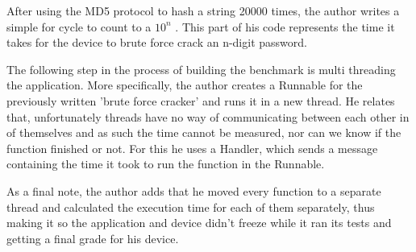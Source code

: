 \documentclass[a4paper,10pt]{report}
\begin{document}
 After using the MD5 protocol to hash a string 20000 times, the author writes a simple for cycle to count to a $ 10^n $ . This part of his code represents the time it takes for the device to brute force crack an n-digit password. 
 
 The following step in the process of building the benchmark is multi threading the application. More specifically, the author creates a Runnable for the previously written 'brute force cracker' and runs it in a new thread. He relates that, unfortunately threads have no way of communicating between each other in of themselves and as such the time cannot be measured, nor can we know if the function finished or not. For this he uses a Handler, which sends a message containing the time it took to run the function in the Runnable.
 
 As a final note, the author adds that he moved every function to a separate thread and calculated the execution time for each of them separately, thus making it so the application and device didn't freeze while it ran its tests and getting a final grade for his device.
\end{document}
